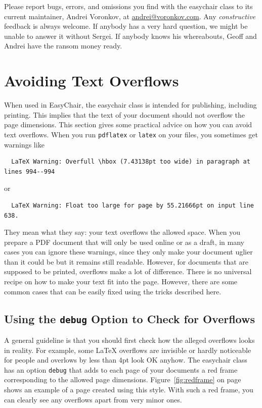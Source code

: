 \documentclass[EPiC]{easychair}
\newcommand{\easychair}{\textsf{easychair}}
\begin{document}
Please report bugs, errors, and omissions you find with the {\easychair} 
class to its current maintainer, Andrei Voronkov,
at \url{andrei@voronkov.com}. Any \emph{constructive} feedback is
always welcome. If anybody has a very hard question, we might be
unable to answer it without Sergei. If anybody knows his whereabouts,
Geoff and Andrei have the ransom money ready.


\section{Avoiding Text Overflows}

When used in EasyChair, the {\easychair} class is intended for
publishing, including printing. This implies that the text of your
document should not overflow the page dimensions. This section gives
some practical advice on how you can avoid text overflows. When you
run \texttt{pdflatex} or \texttt{latex} on your files, you sometimes
get warnings like

\small
\begin{verbatim}
  LaTeX Warning: Overfull \hbox (7.43138pt too wide) in paragraph at lines 994--994
\end{verbatim}
\normalsize
or

\small
\begin{verbatim}
  LaTeX Warning: Float too large for page by 55.21666pt on input line 638.
\end{verbatim}
\normalsize
They mean what they say: your text overflows the allowed space. When
you prepare a PDF document that will only be used online or as a
draft, in many cases you can ignore these warnings, since they only
make your document uglier than it could be but it remains still
readable. However, for documents that are supposed to be printed,
overflows make a lot of difference. There is no universal recipe on
how to make your text fit into the page. However, there are some
common cases that can be easily fixed using the tricks described
here. 

\subsection{Using the \texttt{debug} Option to Check for Overflows}

A general guideline is that you should first check how the alleged
overflows looks in reality. For example, some LaTeX overflows are
invisible or hardly noticeable for people and overlows by
less than 4pt look OK anyhow. The {\easychair} class has an option
\texttt{debug} that adds to each page of your documents a red frame
corresponding to the allowed page
dimensions. Figure~\ref{fig:redframe} on page~\pageref{fig:redframe}
shows an example of a page created using this style. With such a red
frame, you can clearly see any overflows apart from very minor ones.
\end{document}
